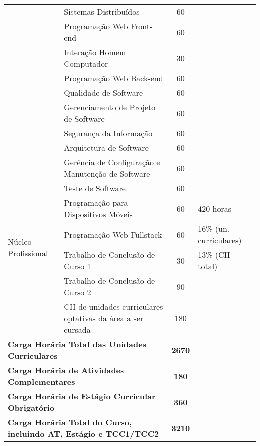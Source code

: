 \begin{quadro}[ht!]
\begin{tabular}{|l|l|c|p{3.2cm}|}
\cline{2-3} & Sistemas Distribuídos & 60 & \\
\cline{2-3} & Programação Web Front-end & 60 & \\
\cline{2-3} & Interação Homem Computador & 30 & \\
\cline{2-3} & Programação Web Back-end & 60 & \\
\cline{2-3} & Qualidade de Software & 60 & \\
\cline{2-3} & Gerenciamento de Projeto de Software & 60 & \\
\cline{2-3} & Segurança da Informação & 60 & \\
\cline{2-3} & Arquitetura de Software & 60 & \\
\cline{2-3} & Gerência de Configuração e Manutenção de Software & 60 & \\
\cline{2-3} & Teste de Software  & 60 & \\
\hline
\multirow{4}{*}{Núcleo Profissional} & Programação para Dispositivos Móveis & 60 & 420 horas  \\
\cline{2-3} & Programação Web Fullstack & 60 & 16\% (un. curriculares)\\
\cline{2-3} & Trabalho de Conclusão de Curso 1 & 30 & 13\% (CH total)\\
\cline{2-3} & Trabalho de Conclusão de Curso 2 & 90 & \\
\cline{2-3} & CH de unidades curriculares optativas da área a ser cursada & 180 & \\
\hline
\multicolumn{2}{|l|}{\textbf{Carga Horária Total das Unidades Curriculares}} & \textbf{2670} &  \\\hline
\multicolumn{2}{|l|}{\textbf{Carga Horária de Atividades Complementares}} & \textbf{180} &  \\\hline
\multicolumn{2}{|l|}{\textbf{Carga Horária de Estágio Curricular Obrigatório}} & \textbf{360} &  \\\hline
\multicolumn{2}{|l|}{\textbf{Carga Horária Total do Curso, incluindo AT, Estágio e TCC1/TCC2}} & \textbf{3210} & \\\hline
\end{tabular}
\end{quadro}
